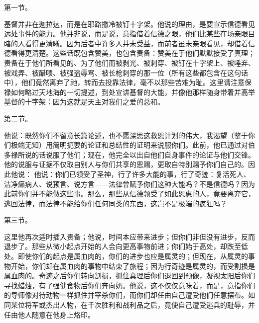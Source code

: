  第一节。\par

基督并非在迦拉达，而是在耶路撒冷被钉十字架。他说的理由，是要宣示信德看见远处事件的能力。他并非说，而是说，意指借着信德之眼，他们比某些在场亲眼目睹的人看得更清晰。因为后者中许多人并未受益，而前者虽未亲眼看见，却借着信德看得更清楚。这些话既包含赞美，也包含责备：赞美在于他们默默接受了真理；责备在于他们所看见的、为了他们而被剥光、被刺穿、被钉在十字架上、被唾弃、被戏弄、被醋喂、被强盗辱骂、被长枪刺穿的那一位（所有这些都包含在这句话中），他们竟然离弃了祂，转而去投靠法律，毫不以那些苦难为耻。这里请注意保禄如何略过天地海的一切提述，到处宣讲基督的大能，并像他那样随身带着并高举基督的十字架：因为这就是天主对我们之爱的总和。\par

 第二节。\par

他说：既然你们不留意长篇论述，也不愿深思这救恩计划的伟大，我渴望（鉴于你们极端无知）用简明扼要的论证和总结性的证明来说服你们。此前，他已通过对伯多禄所说的话说服了他们；现在，他完全以出自他们自身事件的论证与他们交锋。他的说服与证据不仅取自别人与你们共享的恩赐，更取自特别赐予你们自己的。因此他说： 他说：你们已领受了圣神，行了许多大能的事，行了奇迹：复活死人、洁净癞病人、说预言、说方言——法律曾赋予你们这种大能吗？不是信德吗？因为此前你们并不能做这些事。那么，那些从信德领受了如此恩惠的人，竟要离弃它，逃回法律，而法律不能给你们任何同类的东西，这岂不是极端的疯狂吗？\par

 第三节。\par

这里他再次适时插入责备；他说，时间本应带来进步；但你们非但没有进步，反而退步了。那些从微小起点开始的人会向更高事物前进；你们始于高处，却跌至低处。即使你们的起点是属血肉的，你们的进步也应是属灵的；但现在，从属灵的事物开始，你们却在属血肉的事物中结束了旅程；因为行奇迹是属灵的，而受割损是属血肉的。奇迹之后你们转向割损，抓住真理后你们退回到预像，凝视太阳后你们寻找蜡烛，有了强健食物后你们奔向奶。他说，这不仅仅意味着，而是，意指你们的导师像对待动物一样抓住并宰杀你们，而你们却任由自己遭受他们任意摆布。如同某位将军或杰出人物，在千次胜利和战利品之后，竟使自己遭受逃兵的耻辱，并任由他人随意在他身上烙印。\par

